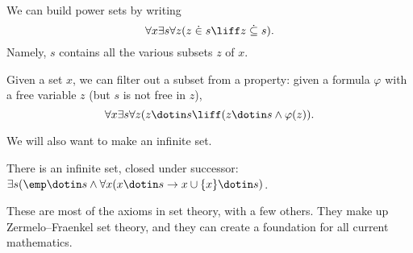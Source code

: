 \begin{axiom}
	We can build power sets by writing
	\[\forall x\exists s\forall z(z\dot{{}\in{}} s\liff z\dot{{}\subseteq{}} s).\]
	Namely, $s$ contains all the various subsets $z$ of $x$.
\end{axiom}
\begin{axiom}[Separation]
	Given a set $x$, we can filter out a subset from a property: given a formula $\varphi$ with a free variable $z$ (but $s$ is not free in $z$),
	\[\forall x\exists s\forall z(z\dotin s\liff(z\dotin s\land\varphi(z)).\]
\end{axiom}
We will also want to make an infinite set.
\begin{axiom}[Infinity]
	There is an infinite set, closed under successor: $\exists s(\emp\dotin s\land\forall x(x\dotin s\to x\cup\{x\}\dotin s)$.
\end{axiom}
These are most of the axioms in set theory, with a few others. They make up Zermelo--Fraenkel set theory, and they can create a foundation for all current mathematics.

